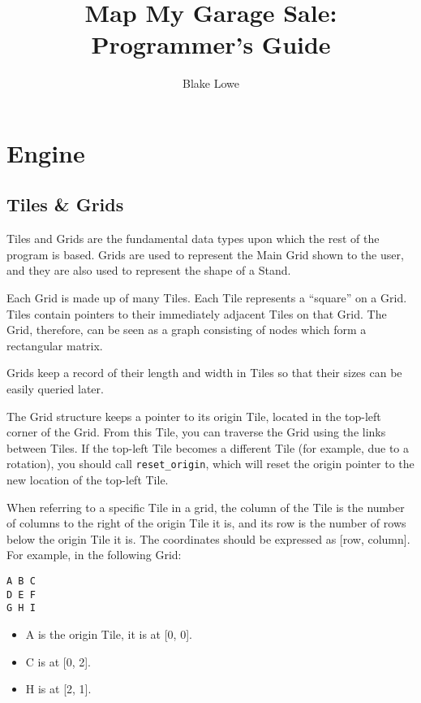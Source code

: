\documentclass{report}
\title{Map My Garage Sale: Programmer's Guide}
\author{Blake Lowe}
\begin{document}
\maketitle
\newpage
{}

\tableofcontents
\newpage

\chapter{Engine}

\section{Tiles \& Grids}
Tiles and Grids are the fundamental data types upon which the rest of the
program is based. Grids are used to represent the Main Grid shown to the user,
and they are also used to represent the shape of a Stand.

Each Grid is made up of many Tiles. Each Tile represents a ``square'' on a
Grid. Tiles contain pointers to their immediately adjacent Tiles on that Grid.
The Grid, therefore, can be seen as a graph consisting of nodes which form
a rectangular matrix.

Grids keep a record of their length and width in Tiles so that their
sizes can be easily queried later.

The Grid structure keeps a pointer to its origin Tile, located in the
top-left corner of the Grid. From this Tile, you can traverse the Grid
using the links between Tiles. If the top-left Tile becomes a different Tile
(for example, due to a rotation), you should call \texttt{reset_origin}, which will
reset the origin pointer to the new location of the top-left Tile.

When referring to a specific Tile in a grid, the column of the Tile
is the number of columns to the right of the origin Tile it is, and
its row is the number of rows below the origin Tile it is.
The coordinates should be expressed as [row, column].
For example, in the following Grid:
\begin{verbatim}
A B C
D E F
G H I
\end{verbatim}
\begin{itemize}
	\item A is the origin Tile, it is at [0, 0].
	\item C is at [0, 2].
	\item H is at [2, 1].
\end{itemize}
\end{document}
